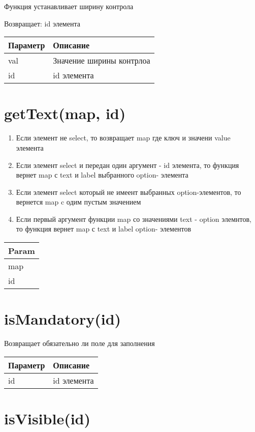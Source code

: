 Функция устанавливает ширину контрола

Возвращает: id элемента

\begin{longtable}[]{@{}ll@{}}
\toprule
Параметр & Описание\tabularnewline
\midrule
\endhead
val & Значение ширины контрлоа\tabularnewline
id & id элемента\tabularnewline
\bottomrule
\end{longtable}

\hypertarget{gettextmap-id-dlmap}{%
\section{getText(map, id)}\label{gettextmap-id-dlmap}}

\begin{enumerate}
\def\labelenumi{\arabic{enumi}.}
\tightlist
\item
  Если элемент не select, то возвращает map где ключ и значени value
  элемента
\item
  Если элемент select и передан один аргумент - id элемента, то функция
  вернет map с text и label выбранного option- элемента
\item
  Если элемент select который не имеент выбранных option-элементов, то
  вернется map c одим пустым значением
\item
  Если первый аргумент функции map со значениями text - option элемнтов,
  то функция вернет map с text и label option- элементов
\end{enumerate}


\begin{longtable}[]{@{}l@{}}
\toprule
Param\tabularnewline
\midrule
\endhead
map\tabularnewline
id\tabularnewline
\bottomrule
\end{longtable}

\hypertarget{ismandatoryid-boolean}{%
\section{isMandatory(id)}\label{ismandatoryid-boolean}}

Возвращает обязательно ли поле для заполнения


\begin{longtable}[]{@{}ll@{}}
\toprule
Параметр & Описание\tabularnewline
\midrule
\endhead
id & id элемента\tabularnewline
\bottomrule
\end{longtable}

\hypertarget{isvisibleid-boolean}{%
\section{isVisible(id)}\label{isvisibleid-boolean}}

